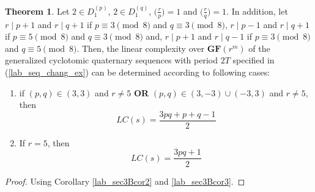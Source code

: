 \documentclass{mcom-l}
\theoremstyle{definition}
\newtheorem{sec3thm2aux2}[sec3thm1]{Theorem}
\numberwithin{equation}{section}
\begin{document}
  \begin{sec3thm2aux2}\label{lab_sec3thm2aux2}
  Let $ 2\in D_{1}^{(p)} $, $ 2\in D_{1}^{(q)} $, $ \bigl(\tfrac{r}{p}\bigr) =1$ and $ \bigl(\tfrac{r}{q}\bigr) =1$. In addition, let $ r\mid p+1 $ and $ r\mid q+1 $ if $ p\equiv 3 \pmod 8 $ and $ q\equiv 3 \pmod 8 $, $ r\mid p-1 $ and $ r\mid q+1 $ if $ p\equiv 5 \pmod 8 $ and $ q\equiv 3 \pmod 8 $ and, $ r\mid p+1 $ and $ r\mid q-1 $ if $ p\equiv 3 \pmod 8 $ and $ q\equiv 5 \pmod 8 $. Then, the linear complexity over $ \mathbf{GF}(r^{m}) $ of the generalized cyclotomic quaternary sequences with period $ 2T $ specified in (\ref{lab_seq_chang_ex}) can be determined according to following cases:
  \begin{enumerate} \item if $ (p,q)\in (3,3) $ and $ r\ne 5 $ \textbf{OR} $ (p,q)\in (3,-3) \cup (-3,3)$ and $ r\ne 5 $, then
      \begin{equation*}
       LC(s)=\dfrac{3pq+p+q-1}{2}
       \end{equation*}
\item If $ r= 5 $, then 
       \begin{equation*}
          LC(s)=\dfrac{3pq+1}{2}
          \end{equation*}
\end{enumerate}
    \end{sec3thm2aux2}
  \begin{proof}
   Using  Corollary \ref{lab_sec3Bcor2} and \ref{lab_sec3Bcor3}.
   \end{proof}  
\end{document}
